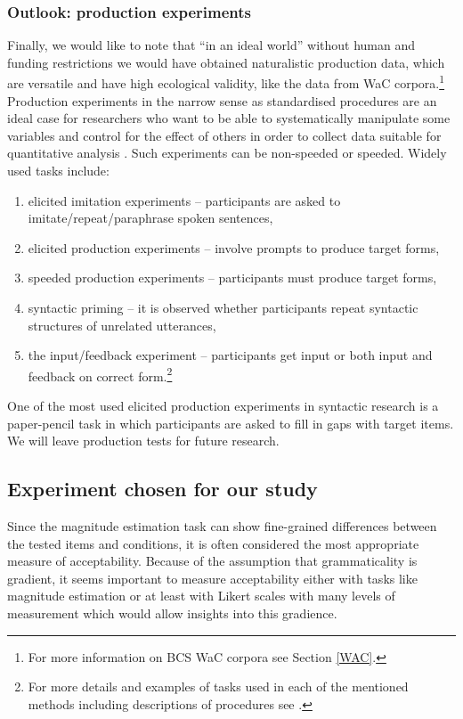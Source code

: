 \subsubsection{Outlook: production experiments}
Finally, we would like to note that ``in an ideal world'' without human and funding restrictions we would have obtained naturalistic production data, which are versatile and have high ecological validity, like the data from WaC corpora.\footnote{For more information on BCS WaC corpora see Section \ref{WAC}.} Production experiments in the narrow sense as standardised procedures are an ideal case for researchers who want to be able to systematically manipulate some variables and control for the effect of others in order to collect data suitable for quantitative analysis \citep[cf.][11]{Eisenbeiss10}. Such experiments can be non-speeded or speeded. Widely used tasks include:
\begin{enumerate}
	
 \item elicited imitation experiments -- participants are asked to imitate\slash repeat\slash paraphrase spoken sentences,
 \item elicited production experiments -- involve prompts to produce target forms,
 \item speeded production experiments -- participants must produce target forms,
 \item syntactic priming -- it is observed whether participants repeat syntactic structures of unrelated utterances,
 \item the input/feedback experiment -- participants get input or both input and feedback on correct form.\footnote{For more details and examples of tasks used in each of the mentioned methods including  descriptions of procedures see \citet{Eisenbeiss10}.} 
\end{enumerate}

 One of the most used elicited production experiments in syntactic research is a paper-pencil task in which participants are asked to fill in gaps with target items. We will leave production tests for future research.	

\subsection{Experiment chosen for our study}
\label{Experiments chosen for our study}
Since the magnitude estimation task can show fine-grained differences between the tested items and conditions, it is often considered the most appropriate measure of acceptability. Because of the assumption that grammaticality is gradient, it seems important to measure acceptability either with tasks like magnitude estimation or at least with Likert scales with many levels of measurement which would allow insights into this gradience. 

